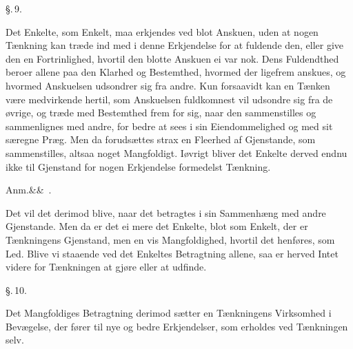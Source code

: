 \documentclass[12pt]{book}
\def\sperr#1{#1}%
\def\textit#1{#1}%
\def\emph#1{#1}%
\newcommand{\sperr}[1]{\textls[180]{#1}}
\newcommand{\parag}[1]{%
  \par\vspace{0.9\baselineskip}%
  {\centering\textit{\S.\,#1.}\par}%
  \vspace{0.35\baselineskip}%
  \noindent\hspace{\parindent}\ignorespaces
}
\newcommand{\anm}[1]{%
  \par\vspace{0.5\baselineskip}%
  \noindent\hspace{\parindent}\sperr{Anm.}\ifx&#1&\else~\textit{#1}.\fi
  \enspace\ignorespaces
}
\newcommand{\opage}[1]{\marginnote{\footnotesize\textit{[#1]}}}
\begin{document}
\parag{9}
Det \emph{Enkelte}, som Enkelt, maa erkjendes ved blot Anskuen, uden at nogen
Tænkning kan træde ind med i denne Erkjendelse for at fuldende den, eller
give den en Fortrinlighed, hvortil den blotte Anskuen ei var nok. Dens
Fuldendthed beroer allene paa den \emph{Klarhed} og \emph{Be}stemthed,
hvormed der ligefrem anskues, og hvormed Anskuelsen udsondrer sig fra andre.
Kun forsaavidt kan en Tænken være medvirkende hertil, som Anskuelsen
fuldkomnest vil udsondre sig fra de øvrige, og træde med Bestemthed frem for
sig, naar den sammenstilles og sammenlignes
\opage{27} med andre, for bedre at sees i sin Eiendommelighed og med sit særegne Præg.
Men da forudsættes strax en Fleerhed af Gjenstande, som sammenstilles, altsaa
noget Mangfoldigt. Iøvrigt bliver det Enkelte derved endnu ikke til Gjenstand
for nogen Erkjendelse formedelst Tænkning.

\anm{}
Det vil det derimod blive, naar det betragtes i sin Sammenhæng med andre
Gjenstande. Men da er det ei mere det Enkelte, blot som Enkelt, der er
Tænkningens Gjenstand, men en vis Mangfoldighed, hvortil det henføres, som
Led. Blive vi staaende ved det Enkeltes Betragtning allene, saa er herved
Intet videre for Tænkningen at gjøre eller at udfinde.

\parag{10}
Det \emph{Mangfoldiges} Betragtning derimod sætter en Tænkningens Virksomhed
i Bevægelse, der fører til nye og bedre Erkjendelser, som erholdes ved
Tænkningen selv.
\end{document}
